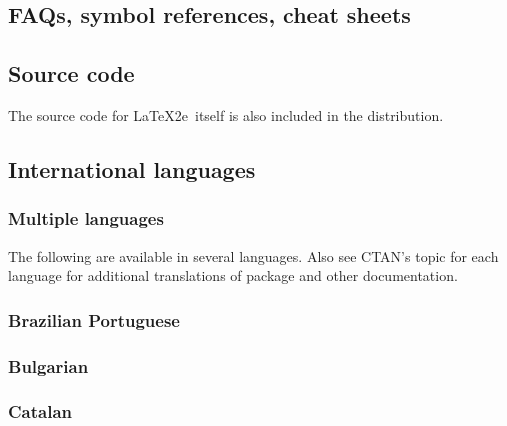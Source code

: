 \documentclass{article}
\def\FAQ{\acro{FAQ}}
\newcommand{\acro}[1]{\textsc{\MakeLowercase{#1}}}
\def\LaTeXe{LaTeX2e}%
\def\acro#1{#1}%
\begin{document}
\subsection{\FAQ{}s, symbol references, cheat sheets}

\printbibliography[
    heading=none,
    category=FAQ,
]


\subsection{Source code}

The source code for \LaTeXe\ itself is also included in the distribution.

\printbibliography[
    heading=none,
    category=source,
]


\subsection{International languages}
\label{sec:international}

\subsubsection{Multiple languages}

    The following are available in several languages.
    Also see CTAN's topic for each language for additional translations of
    package and other documentation.

        \printbibliography[
            heading=none,
            category=langmultiple,
        ]

\subsubsection{Brazilian Portuguese}
        \printbibliography[
            heading=none,
            category=brazilian,
        ]

\subsubsection{Bulgarian}
        \printbibliography[
            heading=none,
            category=bulgarian,
        ]

\subsubsection{Catalan}
        \printbibliography[
            heading=none,
            category=catalan,
        ]
\end{document}
